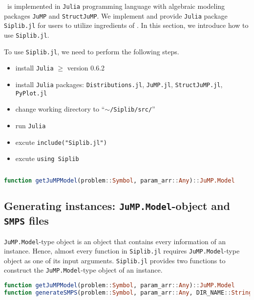 \siplibtwo\ is implemented in \texttt{Julia} programming language with algebraic modeling packages \texttt{JuMP} and \texttt{StructJuMP}. We implement and provide \texttt{Julia} package \texttt{Siplib.jl} for users to utilize ingredients of \siplibtwo. In this section, we introduce how to use \texttt{Siplib.jl}.

To use \texttt{Siplib.jl}, we need to perform the following steps.
\begin{itemize}
	\item install \texttt{Julia} $\ge$ version 0.6.2
	\item install \texttt{Julia} packages: \texttt{Distributions.jl}, \texttt{JuMP.jl}, \texttt{StructJuMP.jl}, \texttt{PyPlot.jl}
	\item change working directory to ``\texttt{$\sim$/Siplib/src/}''
	\item run \texttt{Julia}
	\item excute \texttt{include("Siplib.jl")}
	\item excute \texttt{using Siplib}
\end{itemize}

\begin{lstlisting}[frame=single,language=julia]

\end{lstlisting}

\begin{lstlisting}[frame=single,language=julia]
function getJuMPModel(problem::Symbol, param_arr::Any)::JuMP.Model

\end{lstlisting}

\subsection{Generating instances: \texttt{JuMP.Model}-object and \texttt{SMPS} files}
\texttt{JuMP.Model}-type object is an object that contains every information of an instance. Hence, almost every function in \texttt{Siplib.jl} requires \texttt{JuMP.Model}-type object as one of its input arguments. \texttt{Siplib.jl} provides two functions to construct the \texttt{JuMP.Model}-type object of an instance.
\begin{lstlisting}[frame=single,language=julia]
function getJuMPModel(problem::Symbol, param_arr::Any)::JuMP.Model
function generateSMPS(problem::Symbol, param_arr::Any, DIR_NAME::String="$(dirname(@__FILE__))/../instance")::JuMP.Model
\end{lstlisting}

